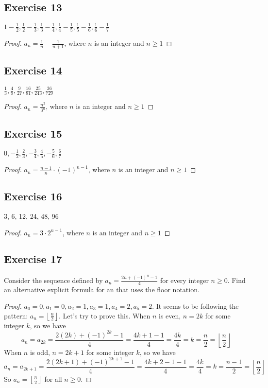\documentclass[14pt]{extarticle}
\newcommand{\dps}{\displaystyle}
\newcommand{\floor}[1]{{\left\lfloor#1\right\rfloor}}
\begin{document}
\subsection{Exercise 13}
$\dps 1 - \frac{1}{2}, \frac{1}{2} - \frac{1}{3}, \frac{1}{3} - \frac{1}{4}, \frac{1}{4} - \frac{1}{5}, \frac{1}{5} - \frac{1}{6}, \frac{1}{6} - \frac{1}{7}$

\begin{proof}
    $\dps a_n = \frac{1}{n} - \frac{1}{n+1}$, where $n$ is an integer and $n \geq 1$
\end{proof}

\subsection{Exercise 14}
$\dps \frac{1}{3}, \frac{4}{9}, \frac{9}{27}, \frac{16}{81}, \frac{25}{243}, \frac{36}{729}$

\begin{proof}
    $\dps a_n = \frac{n^2}{3^n}$, where $n$ is an integer and $n \geq 1$
\end{proof}

\subsection{Exercise 15}
$\dps 0, -\frac{1}{2}, \frac{2}{3}, -\frac{3}{4}, \frac{4}{5}, -\frac{5}{6}, \frac{6}{7}$

\begin{proof}
    $\dps a_n = \frac{n-1}{n}\cdot(-1)^{n-1}$, where $n$ is an integer and $n \geq 1$
\end{proof}

\subsection{Exercise 16}
3, 6, 12, 24, 48, 96

\begin{proof}
    $\dps a_n = 3\cdot 2^{n-1}$, where $n$ is an integer and $n \geq 1$
\end{proof}

\subsection{Exercise 17}
Consider the sequence defined by $\dps a_n = \frac{2n + (-1)^n - 1}{4}$ for every integer $n \geq 0$. Find an alternative explicit formula for an that uses the floor notation.

\begin{proof}
    $a_0 = 0, a_1 = 0, a_2 = 1, a_3 = 1, a_4 = 2, a_5 = 2$. It seems to be following the pattern: $\dps a_n = \floor{\frac{n}{2}}$. Let's try to prove this. When $n$ is even, $n = 2k$ for some integer $k$, so we have
    \[
        a_n = a_{2k} = \frac{2(2k) + (-1)^{2k} - 1}{4} = \frac{4k + 1 - 1}{4} = \frac{4k}{4} = k = \frac{n}{2} = \floor{\frac{n}{2}}
    \]
    When $n$ is odd, $n = 2k+1$ for some integer $k$, so we have
    \[
        a_n = a_{2k+1} = \frac{2(2k+1) + (-1)^{2k+1} - 1}{4} = \frac{4k + 2 - 1 - 1}{4} = \frac{4k}{4} = k = \frac{n-1}{2} = \floor{\frac{n}{2}}
    \]
    So $\dps a_n = \floor{\frac{n}{2}}$ for all $n \geq 0$.
\end{proof}
\end{document}

